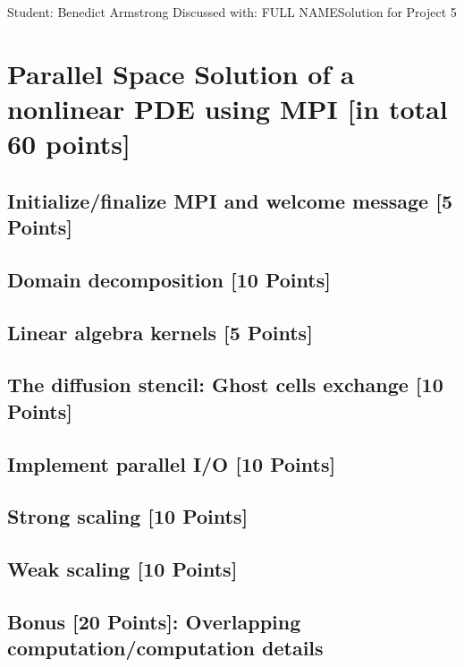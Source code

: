 \documentclass[unicode,11pt,a4paper,oneside,numbers=endperiod,openany]{scrartcl}
\begin{document}
\setassignment
{}

{Student: Benedict Armstrong}
{Discussed with: FULL NAME}{Solution for Project 5}{}
\newline


\section{Parallel Space Solution of a nonlinear PDE using MPI
      [in total 60 points]}

\subsection{Initialize/finalize MPI and welcome message [5 Points]}

\subsection{Domain decomposition [10 Points]}

\subsection{Linear algebra kernels [5 Points]}

\subsection{The diffusion stencil: Ghost cells exchange [10 Points]}

\subsection{Implement parallel I/O [10 Points]}

\subsection{Strong scaling [10 Points]}

\subsection{Weak scaling [10 Points]}

\subsection{Bonus [20 Points]: Overlapping computation/computation details}
\end{document}
